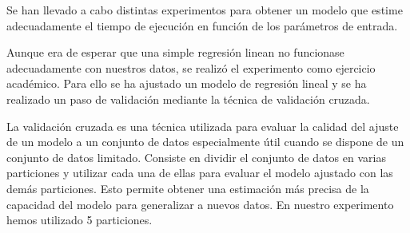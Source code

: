 Se han llevado a cabo distintas experimentos para obtener un modelo que estime adecuadamente el tiempo de ejecución en función de los parámetros de entrada. 

Aunque era de esperar que una simple regresión linean no funcionase adecuadamente con nuestros datos, se realizó el experimento como ejercicio académico. Para ello se ha ajustado un modelo de regresión lineal y se ha realizado un paso de validación mediante la técnica de validación cruzada. 

La validación cruzada es una técnica utilizada para evaluar la calidad del ajuste de un modelo a un conjunto de datos especialmente útil cuando se dispone de un conjunto de datos limitado. Consiste en dividir el conjunto de datos en varias particiones y utilizar cada una de ellas para evaluar el modelo ajustado con las demás particiones. Esto permite obtener una estimación más precisa de la capacidad del modelo para generalizar a nuevos datos. En nuestro experimento hemos utilizado 5 particiones.

